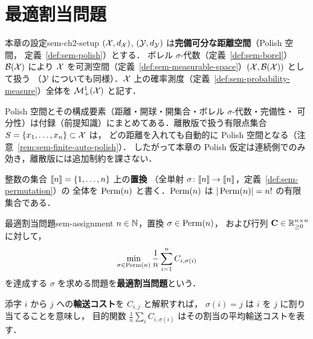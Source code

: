 \chapter{最適割当問題}
\label{ch:sem-assignment-chapter}

\begin{remark}{本章の設定}{sem-ch2-setup}
  $(\mathcal{X}, d_{\mathcal{X}})$, $(\mathcal{Y}, d_{\mathcal{Y}})$ は\textbf{完備可分な距離空間}（Polish 空間，
  定義~\ref{def:sem-polish}）とする．
  ボレル $\sigma$-代数（定義~\ref{def:sem-borel}）$\mathcal{B}(\mathcal{X})$ により
  $\mathcal{X}$ を可測空間（定義~\ref{def:sem-measurable-space}）$(\mathcal{X}, \mathcal{B}(\mathcal{X}))$ として扱う
  （$\mathcal{Y}$ についても同様）．$\mathcal{X}$ 上の確率測度（定義~\ref{def:sem-probability-measure}）全体を $\mathcal{M}_+^1(\mathcal{X})$ と記す．

  Polish 空間とその構成要素（距離・開球・開集合・ボレル $\sigma$-代数・完備性・
  可分性）は付録（前提知識）にまとめてある．離散版で扱う有限点集合 $S = \{x_1, \ldots, x_n\} \subset \mathcal{X}$ は，
  どの距離を入れても自動的に Polish 空間となる（注意~\ref{rem:sem-finite-auto-polish}）．
  したがって本章の Polish 仮定は連続側でのみ効き，離散版には追加制約を課さない．
\end{remark}

整数の集合 $\llbracket n \rrbracket = \{1, \ldots, n\}$ 上の\textbf{置換}
（全単射 $\sigma \colon \llbracket n \rrbracket \to \llbracket n \rrbracket$，定義~\ref{def:sem-permutation}）の
全体を $\operatorname{Perm}(n)$ と書く．$\operatorname{Perm}(n)$ は $|\operatorname{Perm}(n)| = n!$ の有限集合である．

\begin{definition}{最適割当問題}{sem-assignment}
  $n \in \mathbb{N}$，置換 $\sigma \in \operatorname{Perm}(n)$，
  および行列 $\mathbf{C} \in \mathbb{R}_{\geq 0}^{n \times n}$ に対して，
  \[
    \min_{\sigma \in \operatorname{Perm}(n)} \frac{1}{n} \sum_{i=1}^{n} C_{i, \sigma(i)}
  \]
  を達成する $\sigma$ を求める問題を\textbf{最適割当問題}という．
\end{definition}

添字 $i$ から $j$ への\textbf{輸送コスト}を $C_{i,j}$ と解釈すれば，
$\sigma(i) = j$ は $i$ を $j$ に割り当てることを意味し，
目的関数 $\frac{1}{n}\sum_i C_{i, \sigma(i)}$ はその割当の平均輸送コストを表す．

